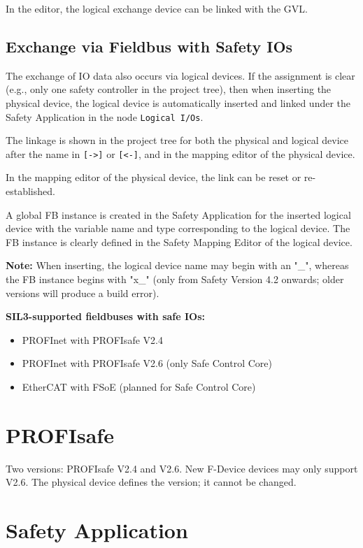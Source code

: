 \documentclass[a4paper,12pt]{article}
\begin{document}
In the editor, the logical exchange device can be linked with the GVL.

\subsection*{Exchange via Fieldbus with Safety IOs}

The exchange of IO data also occurs via logical devices. If the assignment is clear (e.g., only one safety controller in the project tree), then when inserting the physical device, the logical device is automatically inserted and linked under the Safety Application in the node \texttt{Logical I/Os}.

The linkage is shown in the project tree for both the physical and logical device after the name in \texttt{[->]} or \texttt{[<-]}, and in the mapping editor of the physical device.

In the mapping editor of the physical device, the link can be reset or re-established.

A global FB instance is created in the Safety Application for the inserted logical device with the variable name and type corresponding to the logical device. The FB instance is clearly defined in the Safety Mapping Editor of the logical device.

\textbf{Note:} When inserting, the logical device name may begin with an "\_", whereas the FB instance begins with "x\_" (only from Safety Version 4.2 onwards; older versions will produce a build error).

\textbf{SIL3-supported fieldbuses with safe IOs:}
\begin{itemize}
	\item PROFInet with PROFIsafe V2.4
	\item PROFInet with PROFIsafe V2.6 (only Safe Control Core)
	\item EtherCAT with FSoE (planned for Safe Control Core)
\end{itemize}

\section{PROFIsafe}

Two versions: PROFIsafe V2.4 and V2.6. New F-Device devices may only support V2.6. The physical device defines the version; it cannot be changed.

\section{Safety Application}
\end{document}
